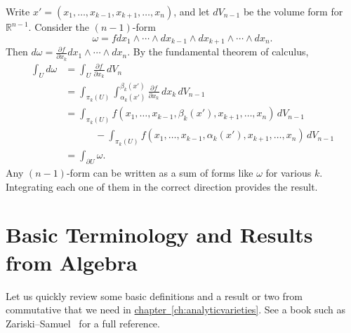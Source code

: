 \documentclass[12pt,openany]{book}
\newcommand{\R}{{\mathbb{R}}}
\theoremstyle{plain}
\theoremstyle{remark}
\theoremstyle{definition}
\theoremstyle{exercise}
\theoremstyle{example}
\newcommand{\chapterref}[1]{\hyperref[#1]{chapter~\ref*{#1}}}
\begin{document}
Write $x' = (x_1,\ldots,x_{k-1},x_{k+1},\ldots,x_n)$, and let $dV_{n-1}$ be the
volume form for $\R^{n-1}$.
Consider the $(n-1)$-form
\begin{equation*}
\omega = f
dx_1 \wedge \cdots \wedge dx_{k-1} \wedge dx_{k+1} \wedge \cdots \wedge dx_n
.
\end{equation*}
Then $d\omega = \frac{\partial f}{\partial x_k} dx_1 \wedge \cdots \wedge
dx_n$.
By the fundamental theorem of
calculus,
\begin{equation*}
\begin{split}
\int_U d\omega &=
\int_U \frac{\partial f}{\partial x_k} \, dV_n
\\
& =
\int_{\pi_k(U)}
\int_{\alpha_k(x')}^{\beta_k(x')}
\frac{\partial f}{\partial x_k} \, dx_k \, dV_{n-1}
\\
& =
\int_{\pi_k(U)}
f(x_1,\ldots,x_{k-1}, \beta_k(x'), x_{k+1}, \ldots, x_n)
\,dV_{n-1}
\\
& \phantom{=xxx}
-
\int_{\pi_k(U)}
f(x_1,\ldots,x_{k-1}, \alpha_k(x'), x_{k+1}, \ldots, x_n)
\,dV_{n-1}
\\
& =
\int_{\partial U} \omega .
\end{split}
\end{equation*}
Any $(n-1)$-form can be written as a sum of forms like $\omega$ for various
$k$.  Integrating each one of them in the correct direction provides the
result.


\chapter{Basic Terminology and Results from Algebra} \label{ap:algebra}

Let us quickly review some basic definitions
and a result or two
from commutative
that we need in
\chapterref{ch:analyticvarieties}.  See a book such as
Zariski--Samuel~\cite{ZariskiSamuel} for a full reference.
\end{document}

